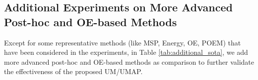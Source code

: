 \documentclass{article}
\theoremstyle{plain}
\theoremstyle{definition}
\theoremstyle{remark}
\begin{document}
\begin{table}[t!]
    \caption{Results of WRN-40-4 when SVHN as OOD set (). Comparison on different ID benchmark datasets.  indicates higher values are better, and  indicates lower values are better.}
    \vspace{2mm}
    \centering
    \footnotesize
    \renewcommand\arraystretch{0.95}
    \label{tab:label_zoom_in_SVHN_wrn}
\end{table}

\subsection{Additional Experiments on More Advanced Post-hoc and OE-based Methods}

Except for some representative methods (like MSP, Energy, OE, POEM) that have been considered in the experiments, in Table \ref{tab:additional_sota}, we add more advanced post-hoc and OE-based methods \cite{sun2021react,sun2022dice,djurisic2023extremely,katz2022training,wang2023outofdistribution} as comparison to further validate the effectiveness of the proposed UM/UMAP.
\end{document}
